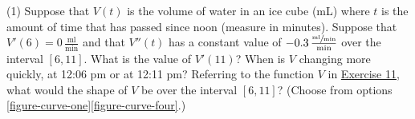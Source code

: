 \documentclass[10pt,oneside,]{book}
\theoremstyle{plain}
\theoremstyle{definition}
\numberwithin{equation}{section}
\newcounter{figstack}
\newlength\fight
\newcommand\pushValignCaptionBottom[5][b]{%
\stepcounter{figstack}%
\expandafter\def\csname %
figalign\romannumeral\value{figstack}\endcsname{#1}%
\expandafter\def\csname %
figtype\romannumeral\value{figstack}\endcsname{#2}%
\expandafter\def\csname %
figwd\romannumeral\value{figstack}\endcsname{#3}%
\expandafter\def\csname %
figcontent\romannumeral\value{figstack}\endcsname{#4}%
\expandafter\def\csname %
figcap\romannumeral\value{figstack}\endcsname{#5}%
\setbox0=\hbox{%
\begin{#2}{#3}#4\end{#2}}%
\ifdim\dimexpr\ht0+\dp0\relax>\fight\global\setlength{\fight}{%
\dimexpr\ht0+\dp0\relax}\fi%
}
\newcommand{\fe}[2]{#1\mathopen{}\left(#2\right)\mathclose{}}
\newcommand{\cinterval}[2]{\left[#1,#2\right]}
\newcommand{\fd}[1]{#1'}
\newcommand{\sd}[1]{#1''}
\begin{document}
\par
\begin{exercisegroup}(1)
\exercise[11.]\hypertarget{exercise-ice-cube}{\null}Suppose that \(\fe{V}{t}\) is the volume of water in an ice cube (\si{\milli\liter}) where \(t\) is the amount of time that has passed since noon (measure in minutes).  Suppose that \(\fe{\fd{V}}{6}=0\,\frac{\text{ml}}{\text{min}}\) and that \(\fe{\sd{V}}{t}\) has a constant value of \(-0.3\,\frac{\sfrac{\text{ml}}{\text{min}}}{\text{min}}\) over the interval \(\cinterval{6}{11}\).  What is the value of \(\fe{\fd{V}}{11}\)?  When is \(V\) changing more quickly, at 12:06 pm or at 12:11 pm?%
\exercise[12.]\hypertarget{exercise-289}{\null}Referring to the function \(V\) in \hyperlink{exercise-ice-cube}{Exercise 11}, what would the shape of \(V\) be over the interval \(\cinterval{6}{11}\)?  (Choose from options \hyperref[figure-curve-one]{\ref{figure-curve-one}}\textendash{}\hyperref[figure-curve-four]{\ref{figure-curve-four}}.)%
\end{exercisegroup}
\end{document}
